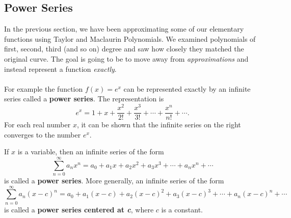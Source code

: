 \subsection*{Power Series}
In the previous section, we have been approximating some of our elementary functions using Taylor and Maclaurin Polynomials. We examined polynomials of first, second, third (and so on) degree and saw how closely they matched the original curve. The goal is going to be to move away from \textit{approximations} and instead represent a function \textit{exactly}.\\
\\
For example the function $f(x)=e^x$ can be represented exactly by an infinite series called a \textbf{power series}. The representation is
\[e^x=1+x+\frac{x^2}{2!}+\frac{x^3}{3!}+\cdots+\frac{x^n}{n!}+\cdots.\]
For each real number $x$, it can be shown that the infinite series on the right converges to the number $e^x$.\\


\begin{tcolorbox}[title= DEFINITIONS OF POWER SERIES,colframe=black,sharp corners,colback=white,colbacktitle=white,coltitle=black]

    If $x$ is a variable, then an infinite series of the form
    \[\sum_{n=0}^{\infty}a_n x^n=a_0 + a_1 x+a_2 x^2+a_3 x^3+\cdots+a_n x^n+\cdots\]
    is called a \textbf{power series}. More generally, an infinite series of the form
    \[\sum_{n=0}^{\infty}a_n (x-c)^n=a_0 + a_1 (x-c)+a_2 (x-c)^2+a_3 (x-c)^3+\cdots+a_n (x-c)^n+\cdots\]
    is called a \textbf{power series centered at \textit{c}}, where $c$ is a constant.

\end{tcolorbox}
\vspace{.1in}

